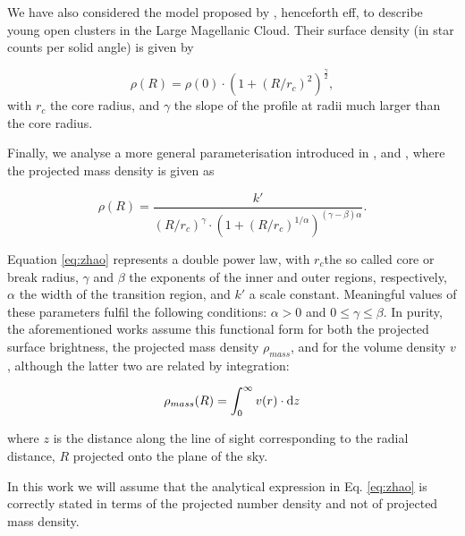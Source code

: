 We have also considered the model proposed by \citet{EFF1987}, henceforth \gls{eff},
to describe young open clusters in the Large
Magellanic Cloud. Their surface density (in star counts per solid
angle) is given by

\begin{equation}
\rho(R)=\rho(0)\cdot(1+(R/r_c)^2)^\frac{\gamma}{2},
\label{eq:eff}
\end{equation}
with $r_c$ the core radius, and $\gamma$ the slope of the profile at radii much larger than the core radius.

Finally, we analyse a more general parameterisation introduced in
\cite{1995AJ....110.2622L}, \cite{1996AJ....111.1889B} and
\cite{Zhao1997}, where the projected mass density is given as

\begin{equation}
  \rho(R) = \frac
      {k'}
      {(R/r_c)^{\gamma}\cdot(1+(R/r_c)^{1/\alpha})^{(\gamma-\beta)\alpha}}.
  \label{eq:zhao}
\end{equation}

Equation \ref{eq:zhao} represents a double power law, with $r_c$the so called core or break radius, $\gamma$
and $\beta$ the exponents of the inner and outer regions, respectively, $\alpha$ the width of the transition region, 
and $k'$ a scale constant. 
Meaningful values of these parameters fulfil the following conditions: $\alpha > 0$ and $0\leq \gamma \leq \beta$. 
In purity, the aforementioned works assume this functional form for both
the projected surface brightness, the projected mass density
$\rho_{mass}$, and for the volume density $v$, although the latter two are
related by integration:

\begin{equation}
  \rho_{mass}(R) = \int_{0}^{\infty}v(r)\cdot {\rm d}z  
\end{equation}

where $z$ is the distance along the line of sight corresponding to the radial distance, $R$ projected onto the plane of the sky.

In this work we will assume that the analytical expression in
Eq. \ref{eq:zhao} is correctly stated in terms of the projected number density
and not of projected mass density.


